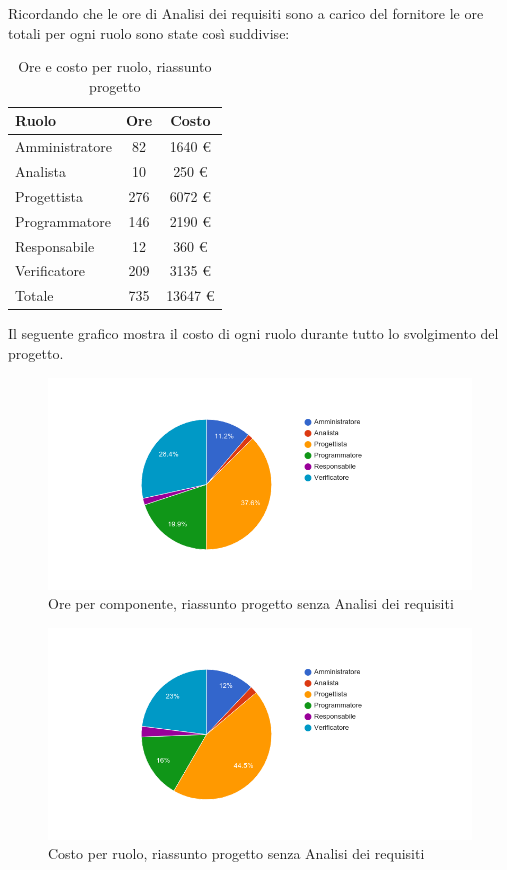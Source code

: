 Ricordando che le ore di Analisi dei requisiti sono a carico del fornitore le ore totali per ogni ruolo sono state così suddivise:
\begin{table}[H]
	\centering
	\begin{tabular}{ l c c }
		\textbf{Ruolo} & \textbf{Ore} & \textbf{Costo} \\
		\hline
		Amministratore & 82 & 1640 \euro{} \\
		Analista & 10 & 250 \euro{} \\
		Progettista & 276 & 6072 \euro{} \\
		Programmatore & 146 & 2190 \euro{} \\
		Responsabile & 12 & 360 \euro{} \\
		Verificatore & 209 & 3135 \euro{} \\
		\hline
		Totale & 735 & 13647 \euro{} \\
		\hline
	\end{tabular}
	\caption{Ore e costo per ruolo, riassunto progetto}
\end{table}

Il seguente grafico mostra il costo di ogni ruolo durante tutto lo svolgimento del progetto.

\begin{figure}[H]
  \begin{center}
    \includegraphics[width=15cm]{res/img/prospettoEconomico/orePerRuoloRiassuntoSenzaAnalisi.png}
  \caption{Ore per componente, riassunto progetto senza Analisi dei requisiti}
  \end{center} 
\end{figure}  

\begin{figure}[H]
  \begin{center}
    \includegraphics[width=15cm]{res/img/prospettoEconomico/costoPerRuoloRiassuntoSenzaAnalisi.png}
  \caption{Costo per ruolo, riassunto progetto senza Analisi dei requisiti}
  \end{center} 
\end{figure}  

\newpage